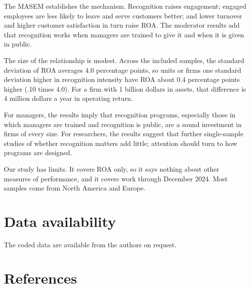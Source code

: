 \documentclass[11pt]{article}
\begin{document}
The MASEM establishes the mechanism. Recognition raises engagement; engaged employees are less likely to leave and serve customers better; and lower turnover and higher customer satisfaction in turn raise ROA. The moderator results add that recognition works when managers are trained to give it and when it is given in public.

The size of the relationship is modest. Across the included samples, the standard deviation of ROA averages 4.0 percentage points, so units or firms one standard deviation higher in recognition intensity have ROA about 0.4 percentage points higher (.10 times 4.0). For a firm with 1 billion dollars in assets, that difference is 4 million dollars a year in operating return.

For managers, the results imply that recognition programs, especially those in which managers are trained and recognition is public, are a sound investment in firms of every size. For researchers, the results suggest that further single-sample studies of whether recognition matters add little; attention should turn to how programs are designed.

Our study has limits. It covers ROA only, so it says nothing about other measures of performance, and it covers work through December 2024. Most samples come from North America and Europe.

\section*{Data availability}

The coded data are available from the authors on request.

\section*{References}
\end{document}
